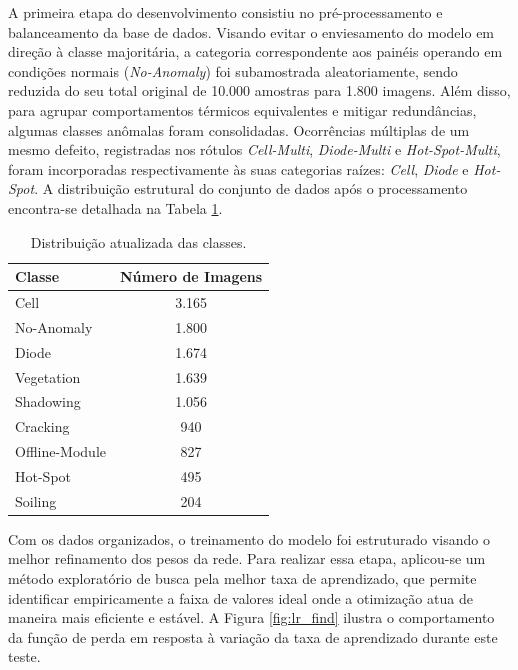 \documentclass[a4paper,11pt]{article}
\begin{document}
A primeira etapa do desenvolvimento consistiu no pré-processamento e balanceamento da base de dados. Visando evitar o enviesamento do modelo em direção à classe majoritária, a categoria correspondente aos painéis operando em condições normais (\textit{No-Anomaly}) foi subamostrada aleatoriamente, sendo reduzida do seu total original de 10.000 amostras para 1.800 imagens. Além disso, para agrupar comportamentos térmicos equivalentes e mitigar redundâncias, algumas classes anômalas foram consolidadas. Ocorrências múltiplas de um mesmo defeito, registradas nos rótulos \textit{Cell-Multi}, \textit{Diode-Multi} e \textit{Hot-Spot-Multi}, foram incorporadas respectivamente às suas categorias raízes: \textit{Cell}, \textit{Diode} e \textit{Hot-Spot}. A distribuição estrutural do conjunto de dados após o processamento encontra-se detalhada na Tabela \ref{tab:dataset_atualizado}.

\begin{table}[htpb]
	\centering
	\caption{Distribuição atualizada das classes.}
	\label{tab:dataset_atualizado}
	\vspace{0.2cm}
	\begin{tabular}{l c}
		\hline
		\textbf{Classe} & \textbf{Número de Imagens} \\
		\hline
		Cell            & 3.165                      \\
		No-Anomaly      & 1.800                      \\
		Diode           & 1.674                      \\
		Vegetation      & 1.639                      \\
		Shadowing       & 1.056                      \\
		Cracking        & 940                        \\
		Offline-Module  & 827                        \\
		Hot-Spot        & 495                        \\
		Soiling         & 204                        \\
		\hline
	\end{tabular}
\end{table}

Com os dados organizados, o treinamento do modelo foi estruturado visando o melhor refinamento dos pesos da rede. Para realizar essa etapa, aplicou-se um método exploratório de busca pela melhor taxa de aprendizado, que permite identificar empiricamente a faixa de valores ideal onde a otimização atua de maneira mais eficiente e estável. A Figura \ref{fig:lr_find} ilustra o comportamento da função de perda em resposta à variação da taxa de aprendizado durante este teste.
\end{document}
